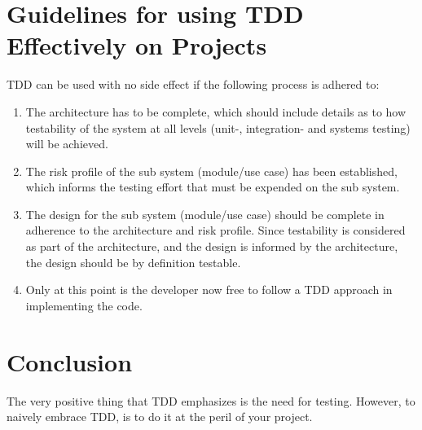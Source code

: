 \documentclass{amsart}
\begin{document}
  \section{Guidelines for using TDD Effectively on Projects}
  TDD can be used with no side effect if the following process is adhered to:
  \begin{enumerate}
   \item The architecture has to be complete, which should include details as to how testability of the system at all levels (unit-, integration- and systems testing) will be achieved.
   \item The risk profile of the sub system (module/use case) has been established, which informs the testing effort that must be expended on the sub system.
   \item The design for the sub system (module/use case) should be complete in adherence to the architecture and risk profile. Since testability is considered as part of the architecture, and the design is informed by the architecture, the design should be by definition testable.
   \item Only at this point is the developer now free to follow a TDD approach in implementing the code.
  \end{enumerate}
  
  \section{Conclusion}
  The very positive thing that TDD emphasizes is the need for testing. However, to naively embrace TDD, is to do it at the peril of your project.


  
  
  
 
\end{document}
